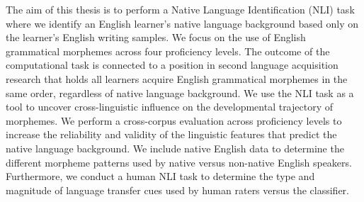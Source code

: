 The aim of this thesis is to perform a Native Language Identification (NLI) task where we identify an English learner's native language background based only on the learner's English writing samples. We focus on the use of English grammatical morphemes across four proficiency levels. The outcome of the computational task is connected to a position in second language acquisition research that holds all learners acquire English grammatical morphemes in the same order, regardless of native language background. We use the NLI task as a tool to uncover cross-linguistic influence on the developmental trajectory of morphemes. We perform a cross-corpus evaluation across proficiency levels to increase the reliability and validity of the linguistic features that predict the native language background. We include native English data to determine the different morpheme patterns used by native versus non-native English speakers. Furthermore, we conduct a human NLI task to determine the type and magnitude of language transfer cues used by human raters versus the classifier.
